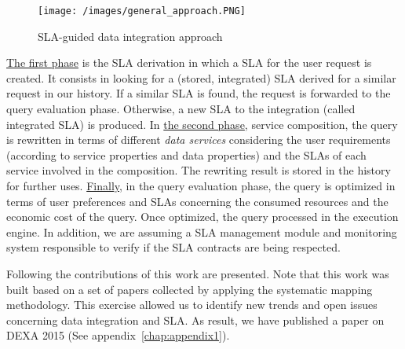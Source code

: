 \begin{figure}[h!]
\center
\texttt{[image: /images/general\_approach.PNG]} 
\caption{SLA-guided data integration approach}\label{approach}
\end{figure}

\underline{The first phase} is the SLA derivation in which a SLA for the user request is created. It consists in looking for a (stored, integrated) SLA derived for a similar request in our history. If a similar SLA is found, the request is forwarded to the query evaluation phase. Otherwise, a new SLA to the integration (called integrated SLA) is produced. 
In \underline{the second phase}, service composition, the query is rewritten in terms of different \textsl{data services} considering the user requirements (according to service properties and data properties) and the SLAs of each service involved in the composition. The rewriting result is stored in the history for further uses. \underline{Finally}, in the query evaluation phase, the query is optimized in terms of user preferences and SLAs concerning the consumed resources and the economic cost of the query. Once optimized, the query processed in the execution engine. In addition, we are assuming a SLA management module and monitoring system responsible to verify if the SLA contracts are being respected. 

Following the contributions of this work are presented. Note that this work was built based on a set of papers collected by applying the systematic mapping methodology. This exercise allowed us to identify new trends and open issues concerning data integration and SLA. As result, we have published a paper on DEXA 2015 (See appendix~\ref{chap:appendix1}).

